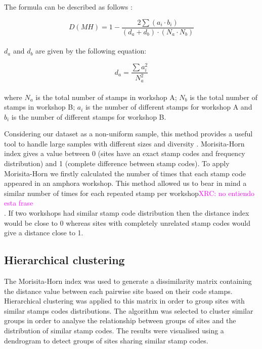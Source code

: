 \documentclass[review]{elsarticle}
\newcommand{\memo}[2]{\textcolor{#1}{#2}}
\newcommand{\xavi}[1]{\memo{magenta}{XRC: #1\\}}
\begin{document}
The formula can be described as follows \citep{magurran_measuring_2013}:

\begin{equation}
D(MH) = 1- \frac{2 \sum(a_{i} \cdot b_{i})}{(d_{a} + d_{b}) \cdot (N_{a} \cdot N_{b})}
\end{equation} \\

$d_{a}$ and $d_{b}$ are given by the following equation:

\begin{equation}
d_{a} = \frac{\sum a_{i}^{2}}{N_{a}^{2}} 
\end{equation} \\

where $N_{a}$ is the total number of stamps in workshop A; $N_{b}$ is the total number of stamps in workshop B; $a_{i}$ is the number of different stamps for workshop A and $b_{i}$ is the number of different stamps for workshop B.

Considering our dataset as a non-uniform sample, this method provides a useful tool to handle large samples with different sizes and diversity \citep{wolda_similarity_1981}. Morisita-Horn index gives a value between 0 (sites have an exact stamp codes and frequency distribution) and 1 (complete difference between stamp codes). To apply Morisita-Horn we firstly calculated the number of times that each stamp code appeared in an amphora workshop. This method allowed us to bear in mind a similar number of times for each repeated stamp per workshop\xavi{no entiendo esta frase}. If two workshops had similar stamp code distribution then the distance index would be close to 0 whereas sites with completely unrelated stamp codes would give a distance close to 1.

\subsection{Hierarchical clustering}

The Morisita-Horn index was used to generate a dissimilarity matrix containing the distance value between each pairwise site based on their code stamps. Hierarchical clustering was applied to this matrix in order to group sites with similar stamps codes distributions. The algorithm was selected to cluster similar groups in order to analyse the relationship between groups of sites and the distribution of similar stamp codes. The results were visualised using a dendrogram to detect groups of sites sharing similar stamp codes.  
\end{document}
